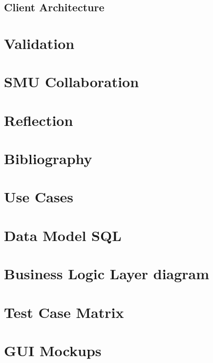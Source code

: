 \documentclass{report}
\begin{document}


\section{Client Architecture}


\chapter{Validation}


\chapter{SMU Collaboration}


\chapter{Reflection}


\chapter{Bibliography}


\appendix

\chapter{Use Cases}


\chapter{Data Model SQL}
\label{app:sql}


\chapter{Business Logic Layer diagram}


\newpage
\restoregeometry

\chapter{Test Case Matrix}
\label{app:testcasematrix}


\chapter{GUI Mockups}
\label{app:mockups}

\end{document}
